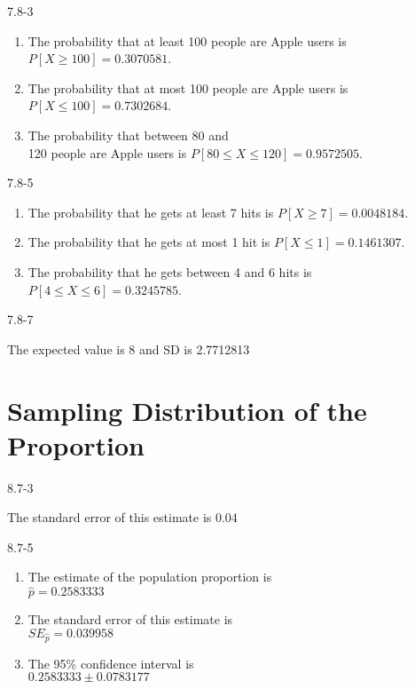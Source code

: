 \begin{exsol@solution}{7.8-3}

\begin{enumerate}
\item The probability that at least 100 people are Apple users is $P[X \ge 100] = 0.3070581$.
\item The probability that at most 100 people are Apple users is $P[X \le 100] = 0.7302684$.
\item The probability that between 80 and \\ 120 people are Apple users is $P[ 80 \le X \le 120] = 0.9572505$.
\end{enumerate}
\end{exsol@solution}
\begin{exsol@solution}{7.8-5}

\begin{enumerate}
\item The probability that he gets at least 7 hits is $P[X \ge 7] = 0.0048184$.
\item The probability that he gets at most 1 hit is $P[X \le 1] = 0.1461307$.
\item The probability that he gets between 4 and 6 hits is $P[4 \le X \le 6] = 0.3245785$.
\end{enumerate}

\end{exsol@solution}
\begin{exsol@solution}{7.8-7}

The expected value is 8 and SD is 2.7712813
\end{exsol@solution}
\setcounter{chapter}{8}\chapter{Sampling Distribution of the Proportion}
\begin{exsol@solution}{8.7-3}

The standard error of this estimate is 0.04

\end{exsol@solution}
\begin{exsol@solution}{8.7-5}

\begin{enumerate}
\item	The estimate of the population proportion is \\ $ = 0.2583333$
\item	The standard error of this estimate is \\ $SE_{} = 0.039958$
\item	The 95\% confidence interval is \\ $0.2583333 $
\end{enumerate}
\end{exsol@solution}
